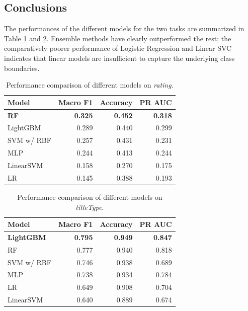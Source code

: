 \subsection{Conclusions}
The performances of the different models for the two tasks are summarized in Table \ref{tab:rating_models} and \ref{tab:titletype_models}. Ensemble methods have clearly outperformed the rest; the comparatively poorer performance of Logistic Regression and Linear SVC indicates that linear models are insufficient to capture the underlying class boundaries.

\begin{table}
    \centering
    \small
    \renewcommand{\arraystretch}{0.9}
    \begin{tabular}{lrrr}
    \toprule
    \textbf{Model} & \textbf{Macro F1} & \textbf{Accuracy} & \textbf{PR AUC} \\
    \midrule
    \textbf{RF}         & \textbf{0.325} & \textbf{0.452} & \textbf{0.318} \\
    LightGBM   & 0.289 & 0.440 & 0.299 \\
    SVM w/ RBF & 0.257 & 0.431 & 0.231 \\
    MLP        & 0.244 & 0.413 & 0.244 \\
    LinearSVM  & 0.158 & 0.270 & 0.175 \\
    LR         & 0.145 & 0.388 & 0.193 \\
    \bottomrule
    \end{tabular}
    \caption{Performance comparison of different models on \textit{rating}.}
    \label{tab:rating_models}
\end{table}

\begin{table}
    \centering
    \small
    \renewcommand{\arraystretch}{0.9}
    \begin{tabular}{lrrr}
    \toprule
    \textbf{Model} & \textbf{Macro F1} & \textbf{Accuracy} & \textbf{PR AUC} \\
    \midrule
    \textbf{LightGBM}   & \textbf{0.795} & \textbf{0.949} & \textbf{0.847} \\
    RF         & 0.777 & 0.940 & 0.818 \\
    SVM w/ RBF & 0.746 & 0.938 & 0.689 \\
    MLP        & 0.738 & 0.934 & 0.784 \\
    LR         & 0.649 & 0.908 & 0.704 \\
    LinearSVM  & 0.640 & 0.889 & 0.674 \\
    \bottomrule
    \end{tabular}
    \caption{Performance comparison of different models on \textit{titleType}.}
    \label{tab:titletype_models}
\end{table}

